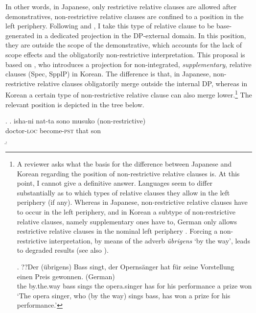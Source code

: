 \documentclass [output=book,colorlinks,citecolor=brown]{langscibook}
\begin{document}
In other words, in Japanese, only restrictive relative clauses are allowed after demonstratives, non-restrictive relative clauses are confined to a position in the left periphery. Following \citet{ishizuka:2008:RC} and \citet{cinque:2008:two}, I take this type of relative clause to be base-generated in a dedicated projection in the DP-external domain. In this position, they are outside the scope of the demonstrative, which accounts for the lack of scope effects and the obligatorily non-restrictive interpretation. This proposal is based on \citet{kim:2019:syntax}, who introduces a projection for non-integrated, \textit{supplementary}, relative clauses (Spec, SpplP) in Korean. The difference is that, in Japanese, non-restrictive relative clauses obligatorily merge outside the internal DP, whereas in Korean a certain type of non-restrictive relative clause can also merge lower.\footnote{\label{footnote German RC} A reviewer asks what the basis for the difference between Japanese and Korean regarding the position of non-restrictive relative clauses is. At this point, I cannot give a definitive answer. Languages seem to differ substantially as to which types of relative clauses they allow in the left periphery (if any). Whereas in Japanese, non-restrictive relative clauses have to occur in the left periphery, and in Korean a subtype of non-restrictive relative clauses, namely supplementary ones have to, German only allows restrictive relative clauses in the nominal left periphery \citep{kohlich:2026:ms}. Forcing a non-restrictive interpretation, by means of the adverb \textit{übrigens} `by the way', leads to degraded results (see also \citealt{bhatt:1990:syntaktisch, roehrs:2019:left}).

\par

\exg. ??Der (übrigens) Bass singt, der Opernsänger hat für seine Vorstellung einen Preis gewonnen. (German)\\
the by.the.way bass sings the opera.singer has for his performance a prize won\\
`The opera singer, who (by the way) sings bass, has won a prize for his performance.’

}  The relevant position is depicted in the tree below.

\newpage

 \ex. \ag. isha-ni nat-ta sono musuko (non-restrictive)\\
doctor-\textsc{loc} become-\textsc{pst} that son\\
\b. 
\end{document}
